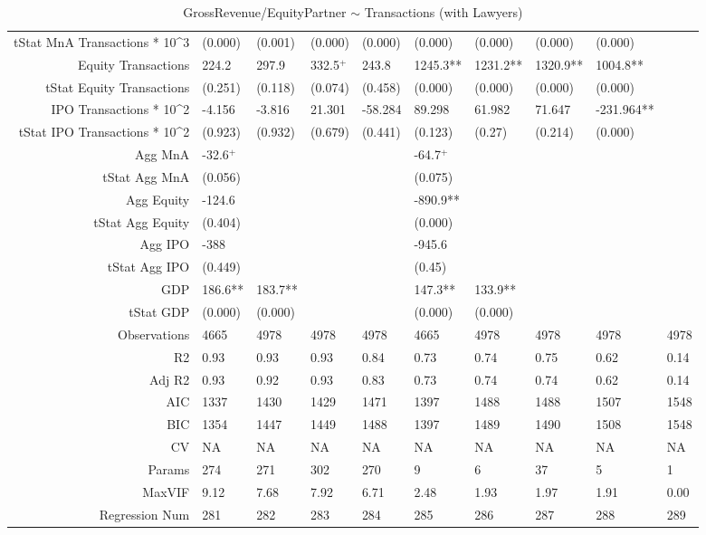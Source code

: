 \begin{table}[ht]
\begin{tabular}{rlllllllll}
  tStat MnA Transactions * 10^3 & (0.000) & (0.001) & (0.000) & (0.000) & (0.000) & (0.000) & (0.000) & (0.000) &  \\ 
  Equity Transactions & 224.2 & 297.9 & 332.5$^{+}$ & 243.8 & 1245.3** & 1231.2** & 1320.9** & 1004.8** &  \\ 
  tStat Equity Transactions & (0.251) & (0.118) & (0.074) & (0.458) & (0.000) & (0.000) & (0.000) & (0.000) &  \\ 
  IPO Transactions * 10^2 & -4.156 & -3.816 & 21.301 & -58.284 & 89.298 & 61.982 & 71.647 & -231.964** &  \\ 
  tStat IPO Transactions * 10^2 & (0.923) & (0.932) & (0.679) & (0.441) & (0.123) & (0.27) & (0.214) & (0.000) &  \\ 
  Agg MnA & -32.6$^{+}$ &  &  &  & -64.7$^{+}$ &  &  &  &  \\ 
  tStat Agg MnA & (0.056) &  &  &  & (0.075) &  &  &  &  \\ 
  Agg Equity & -124.6 &  &  &  & -890.9** &  &  &  &  \\ 
  tStat Agg Equity & (0.404) &  &  &  & (0.000) &  &  &  &  \\ 
  Agg IPO & -388 &  &  &  & -945.6 &  &  &  &  \\ 
  tStat Agg IPO & (0.449) &  &  &  & (0.45) &  &  &  &  \\ 
  GDP & 186.6** & 183.7** &  &  & 147.3** & 133.9** &  &  &  \\ 
  tStat GDP & (0.000) & (0.000) &  &  & (0.000) & (0.000) &  &  &  \\ 
  Observations & 4665 & 4978 & 4978 & 4978 & 4665 & 4978 & 4978 & 4978 & 4978 \\ 
  R2 & 0.93 & 0.93 & 0.93 & 0.84 & 0.73 & 0.74 & 0.75 & 0.62 & 0.14 \\ 
  Adj R2 & 0.93 & 0.92 & 0.93 & 0.83 & 0.73 & 0.74 & 0.74 & 0.62 & 0.14 \\ 
  AIC & 1337 & 1430 & 1429 & 1471 & 1397 & 1488 & 1488 & 1507 & 1548 \\ 
  BIC & 1354 & 1447 & 1449 & 1488 & 1397 & 1489 & 1490 & 1508 & 1548 \\ 
  CV & NA & NA & NA & NA & NA & NA & NA & NA & NA \\ 
  Params & 274 & 271 & 302 & 270 & 9 & 6 & 37 & 5 & 1 \\ 
  MaxVIF & 9.12 & 7.68 & 7.92 & 6.71 & 2.48 & 1.93 & 1.97 & 1.91 & 0.00 \\ 
  Regression Num & 281 & 282 & 283 & 284 & 285 & 286 & 287 & 288 & 289 \\ 
   \hline
\end{tabular}
\caption{GrossRevenue/EquityPartner $\sim$ Transactions (with Lawyers)} 
\end{table}
